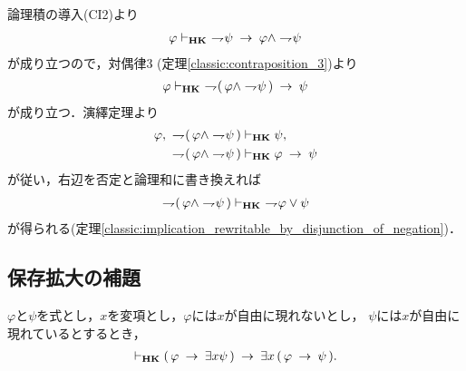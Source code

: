 	\begin{sketch}
		論理積の導入(CI2)より
		\begin{align}
			\varphi \vdash_{{\scriptsize \mbox{{\bf HK}}}}\ \rightharpoondown\hspace{-0.25em} \psi
			\hspace{0.25em}\rightarrow\hspace{0.25em} \varphi \wedge \rightharpoondown\hspace{-0.25em} \psi
		\end{align}
		が成り立つので，対偶律3 (定理\ref{classic:contraposition_3})より
		\begin{align}
			\varphi \provable{\mbox{{\bf HK}}}\ 
			\negation (\, \varphi \wedge \negation \psi\, ) \rarrow \psi
		\end{align}
		が成り立つ．演繹定理より
		\begin{align}
			\varphi,\ \rightharpoondown\hspace{-0.25em} (\, \varphi \wedge \rightharpoondown\hspace{-0.25em} \psi\, ) 
			&\vdash_{{\scriptsize \mbox{{\bf HK}}}} \psi, \\
			\rightharpoondown\hspace{-0.25em} (\, \varphi \wedge \rightharpoondown\hspace{-0.25em} \psi\, ) 
			&\vdash_{{\scriptsize \mbox{{\bf HK}}}} \varphi \hspace{0.25em}\rightarrow\hspace{0.25em} \psi
		\end{align}
		が従い，右辺を否定と論理和に書き換えれば
		\begin{align}
			\rightharpoondown\hspace{-0.25em} (\, \varphi \wedge \rightharpoondown\hspace{-0.25em} \psi\, ) 
			\vdash_{{\scriptsize \mbox{{\bf HK}}}}\ \rightharpoondown\hspace{-0.25em} \varphi \vee \psi
		\end{align}
		が得られる(定理\ref{classic:implication_rewritable_by_disjunction_of_negation})．
		\QED
	\end{sketch}
	
\subsection{保存拡大の補題}
	\begin{screen}
		\begin{thm}
		\label{classic:no_description_2}
			$\varphi$と$\psi$を式とし，$x$を変項とし，$\varphi$には$x$が自由に現れないとし，
			$\psi$には$x$が自由に現れているとするとき，
			\begin{align}
				\vdash_{{\scriptsize \mbox{{\bf HK}}}} (\, \varphi \hspace{0.25em}\rightarrow\hspace{0.25em} \exists x \psi\, )
				\hspace{0.25em}\rightarrow\hspace{0.25em} \exists x\, (\, \varphi \hspace{0.25em}\rightarrow\hspace{0.25em} \psi\, ).
			\end{align}
		\end{thm}
	\end{screen}
	
